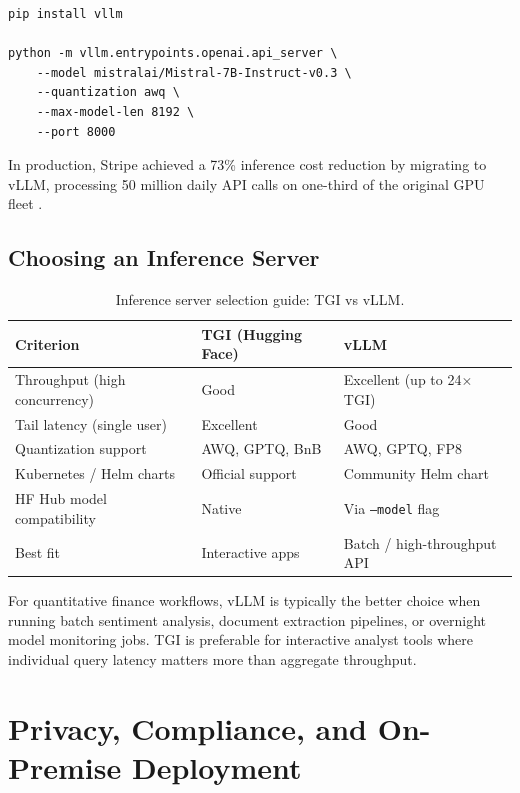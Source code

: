 \begin{verbatim}
pip install vllm

python -m vllm.entrypoints.openai.api_server \
    --model mistralai/Mistral-7B-Instruct-v0.3 \
    --quantization awq \
    --max-model-len 8192 \
    --port 8000
\end{verbatim}

In production, Stripe achieved a 73\% inference cost reduction by migrating
to vLLM, processing 50 million daily API calls on one-third of the original
GPU fleet \citep{kwon2023vllm}.

\subsection{Choosing an Inference Server}
\label{app:hf:server-choice}

\begin{table}[ht]
\centering
\caption{Inference server selection guide: TGI vs vLLM.}
\label{tab:server-choice}
\begin{tabular}{lll}
\toprule
\textbf{Criterion} & \textbf{TGI (Hugging Face)} & \textbf{vLLM} \\
\midrule
Throughput (high concurrency) & Good              & Excellent (up to 24$\times$ TGI) \\
Tail latency (single user)    & Excellent         & Good \\
Quantization support          & AWQ, GPTQ, BnB    & AWQ, GPTQ, FP8 \\
Kubernetes / Helm charts      & Official support  & Community Helm chart \\
HF Hub model compatibility    & Native            & Via \texttt{--model} flag \\
Best fit                      & Interactive apps  & Batch / high-throughput API \\
\bottomrule
\end{tabular}
\end{table}

For quantitative finance workflows, vLLM is typically the better choice when
running batch sentiment analysis, document extraction pipelines, or overnight
model monitoring jobs.  TGI is preferable for interactive analyst tools where
individual query latency matters more than aggregate throughput.

\section{Privacy, Compliance, and On-Premise Deployment}
\label{app:hf:privacy}

